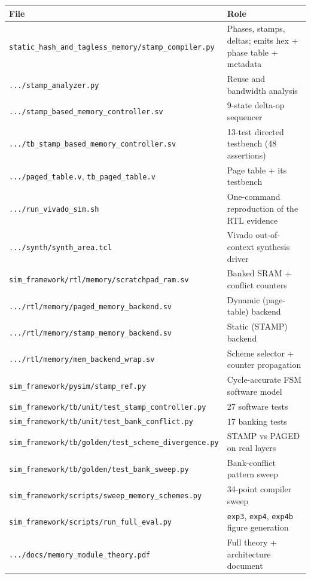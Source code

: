 \documentclass[11pt,a4paper]{article}
\newcommand{\file}[1]{\texttt{\small #1}}
\begin{document}
\begin{center}
\small
\begin{longtable}{@{}p{7.2cm}p{8.4cm}@{}}
\toprule
\textbf{File} & \textbf{Role} \\
\midrule
\endhead
\file{static\_hash\_and\_tagless\_memory/stamp\_compiler.py} & Phases, stamps, deltas; emits hex + phase table + metadata \\
\file{.../stamp\_analyzer.py} & Reuse and bandwidth analysis \\
\file{.../stamp\_based\_memory\_controller.sv} & 9-state delta-op sequencer \\
\file{.../tb\_stamp\_based\_memory\_controller.sv} & 13-test directed testbench (48 assertions) \\
\file{.../paged\_table.v}, \file{tb\_paged\_table.v} & Page table + its testbench \\
\file{.../run\_vivado\_sim.sh} & One-command reproduction of the RTL evidence \\
\file{.../synth/synth\_area.tcl} & Vivado out-of-context synthesis driver \\
\file{sim\_framework/rtl/memory/scratchpad\_ram.sv} & Banked SRAM + conflict counters \\
\file{.../rtl/memory/paged\_memory\_backend.sv} & Dynamic (page-table) backend \\
\file{.../rtl/memory/stamp\_memory\_backend.sv} & Static (STAMP) backend \\
\file{.../rtl/memory/mem\_backend\_wrap.sv} & Scheme selector + counter propagation \\
\file{sim\_framework/pysim/stamp\_ref.py} & Cycle-accurate FSM software model \\
\file{sim\_framework/tb/unit/test\_stamp\_controller.py} & 27 software tests \\
\file{sim\_framework/tb/unit/test\_bank\_conflict.py} & 17 banking tests \\
\file{sim\_framework/tb/golden/test\_scheme\_divergence.py} & STAMP vs PAGED on real layers \\
\file{sim\_framework/tb/golden/test\_bank\_sweep.py} & Bank-conflict pattern sweep \\
\file{sim\_framework/scripts/sweep\_memory\_schemes.py} & 34-point compiler sweep \\
\file{sim\_framework/scripts/run\_full\_eval.py} & \file{exp3}, \file{exp4}, \file{exp4b} figure generation \\
\file{.../docs/memory\_module\_theory.pdf} & Full theory + architecture document \\
\bottomrule
\end{longtable}
\end{center}
\end{document}
